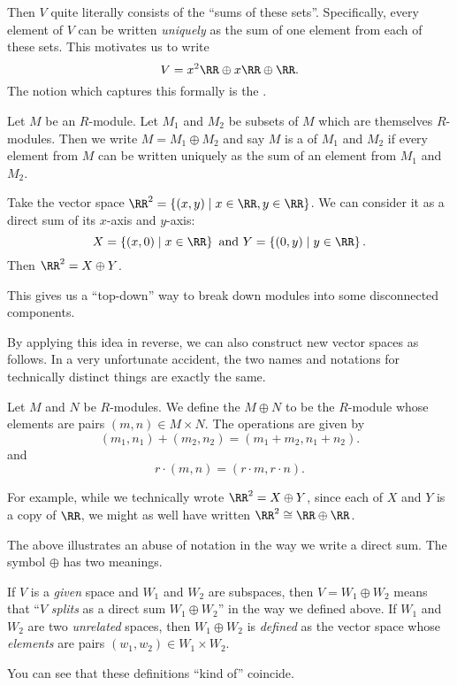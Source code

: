 Then $V$ quite literally consists of the ``sums of these sets''.
Specifically, every element of $V$ can be written \emph{uniquely}
as the sum of one element from each of these sets.
This motivates us to write
\[ V = x^2\RR \oplus x\RR \oplus \RR. \]
The notion which captures this formally is the .

\begin{definition}
	Let $M$ be an $R$-module.
	Let $M_1$ and $M_2$ be subsets of $M$ which are themselves $R$-modules.
	Then we write $M = M_1 \oplus M_2$ and say $M$ is a 
	of $M_1$ and $M_2$
	if every element from $M$ can be written uniquely as the sum
	of an element from $M_1$ and $M_2$.
\end{definition}
\begin{example}
	Take the vector space $\RR^2 = \left\{ (x,y) \mid x \in \RR, y \in \RR \right\}$.
	We can consider it as a direct sum of its $x$-axis and $y$-axis:
	\[ X = \left\{ (x,0) \mid x \in \RR  \right\}
		\text{ and }
		Y = \left\{ (0,y) \mid y \in \RR \right\}. \]
	Then $\RR^2 = X \oplus Y$.
\end{example}

This gives us a ``top-down'' way to break down modules
into some disconnected components.

By applying this idea in reverse, we can also construct
new vector spaces as follows.
In a very unfortunate accident, the two names and notations for technically
distinct things are exactly the same.
\begin{definition}
	Let $M$ and $N$ be $R$-modules.
	We define the  $M \oplus N$
	to be the $R$-module whose elements are pairs $(m,n) \in M \times N$.
	The operations are given by
	\[ (m_1, n_1) + (m_2, n_2) = (m_1+m_2, n_1+n_2). \]
	and
	\[ r \cdot (m, n) = (r \cdot m, r \cdot n). \]
\end{definition}

For example, while we technically wrote $\RR^2 = X \oplus Y$,
since each of $X$ and $Y$ is a copy of $\RR$,
we might as well have written $\RR^2 \cong \RR \oplus \RR$.

\begin{abuse}
	The above illustrates an abuse of notation in the way we write a direct sum. The symbol $\oplus$ has two meanings.
	\begin{itemize}
		\ii If $V$ is a \emph{given} space and $W_1$ and $W_2$ are subspaces, then $V = W_1 \oplus W_2$ means that ``$V$ \emph{splits} as a direct sum $W_1 \oplus W_2$'' in the way we defined above.
		\ii If $W_1$ and $W_2$ are two \emph{unrelated} spaces, then $W_1 \oplus W_2$ is \emph{defined} as the vector space whose \emph{elements} are pairs $(w_1, w_2) \in W_1 \times W_2$.
	\end{itemize}
	You can see that these definitions ``kind of'' coincide.
\end{abuse}

